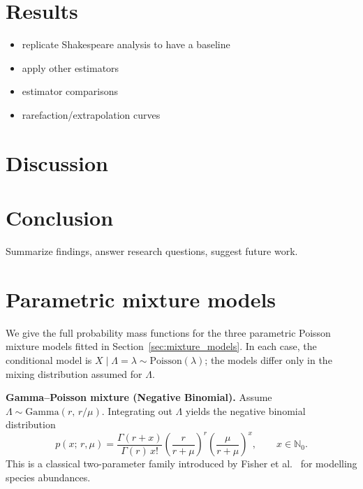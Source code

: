 \documentclass{article}
\begin{document}
\section{Results}\label{sec:results}

\begin{itemize}
    \item replicate Shakespeare analysis to have a baseline
    \item apply other estimators
    \item estimator comparisons
    \item rarefaction/extrapolation curves
\end{itemize}

\section{Discussion}\label{sec:discussion}

\section{Conclusion}\label{sec:conclusion}

Summarize findings, answer research questions, suggest future work.


\appendix

\section{Parametric mixture models}\label{app:parametric_models}

We give the full probability mass functions for the three parametric
Poisson mixture models fitted in Section~\ref{sec:mixture_models}. In
each case, the conditional model is
$X \mid \Lambda = \lambda \sim \mathrm{Poisson}(\lambda)$; the models
differ only in the mixing distribution assumed for $\Lambda$.

\medskip

\noindent\textbf{Gamma--Poisson mixture (Negative Binomial).}\;
Assume $\Lambda \sim \mathrm{Gamma}(r,\, r/\mu)$.
Integrating out $\Lambda$ yields the negative binomial distribution
\[
p(x;\,r,\mu)
= \frac{\Gamma(r+x)}{\Gamma(r)\,x!}
  \left(\frac{r}{r+\mu}\right)^{\!r}
  \left(\frac{\mu}{r+\mu}\right)^{\!x},
\qquad x \in \mathbb{N}_0.
\]
This is a classical two-parameter family introduced by
Fisher et al.~\cite{fisher1943} for modelling species abundances.
\end{document}
